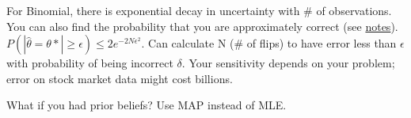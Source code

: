 For Binomial, there is exponential decay in uncertainty with \# of observations.  %
You can also find the probability that you are approximately correct (see \href{http://courses.cs.washington.edu/courses/cse446/16wi/Slides/3_PointEstimation.pdf}{notes}).  \hfill \\
$P(|\widehat{\theta} = \theta*| \geq \epsilon) \leq 2e^{-2N\epsilon^2}$.  Can calculate N (\# of flips) to have error less than $\epsilon$ with probability of being incorrect $\delta$.  Your sensitivity depends on your problem; error on stock market data might cost billions. 

What if you had prior beliefs?  Use MAP instead of MLE.


